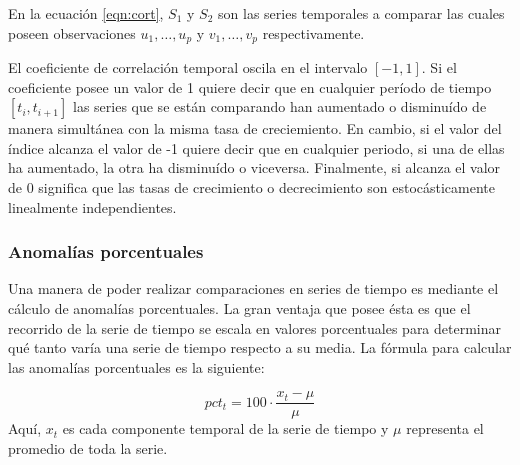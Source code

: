      En la ecuación \ref{eqn:cort}, $S_1$ y $S_2$ son las series temporales a comparar las cuales poseen observaciones $ u_1,\dots,u_p $ y $ v_1,\dots,v_p$ respectivamente.

     El coeficiente de correlación temporal oscila en el intervalo $[-1,1]$. Si el coeficiente posee un valor de 1 quiere decir que en cualquier período de tiempo $[t_i,t_{i+1}]$ las series
     que se están comparando han aumentado o disminuído de manera simultánea con la misma tasa de creciemiento. En cambio, si el valor del índice alcanza el valor de -1 quiere decir que en cualquier periodo, si una de ellas ha
     aumentado, la otra ha disminuído o viceversa. Finalmente, si alcanza el valor de 0 significa que las tasas de crecimiento o decrecimiento son estocásticamente linealmente independientes\cite{27}.

     \subsubsection{Anomalías porcentuales}
     Una manera de poder realizar comparaciones en series de tiempo es mediante el cálculo de anomalías porcentuales. La gran ventaja que posee ésta es que el recorrido de la serie de tiempo
     se escala en valores porcentuales para determinar qué tanto varía una serie de tiempo respecto a su media. La fórmula para calcular las anomalías porcentuales es la siguiente:

    \begin{equation}
        pct_t = 100 \cdot\frac{x_t-\mu}{\mu}
    \end{equation}
    Aquí, $x_t$ es cada componente temporal de la serie de tiempo y $\mu$ representa el promedio de toda la serie. 
